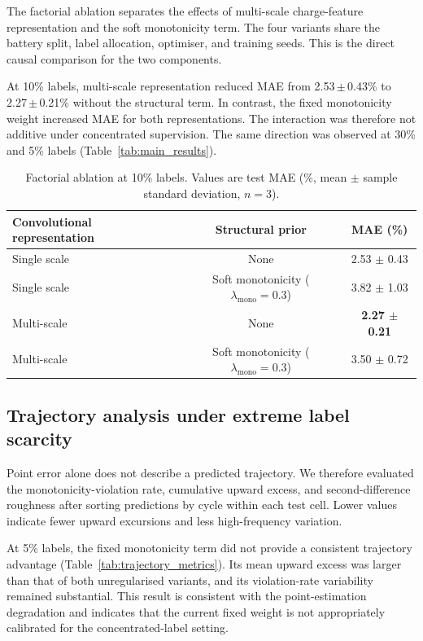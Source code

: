 \documentclass[pdflatex,sn-mathphys-num]{sn-jnl}
\begin{document}
The factorial ablation separates the effects of multi-scale charge-feature representation and the soft monotonicity term. The four variants share the battery split, label allocation, optimiser, and training seeds. This is the direct causal comparison for the two components.

At 10\% labels, multi-scale representation reduced MAE from 2.53\,$\pm$\,0.43\% to 2.27\,$\pm$\,0.21\% without the structural term. In contrast, the fixed monotonicity weight increased MAE for both representations. The interaction was therefore not additive under concentrated supervision. The same direction was observed at 30\% and 5\% labels (Table~\ref{tab:main_results}).

\begin{table}[t]
\caption{Factorial ablation at 10\% labels. Values are test MAE (\%, mean $\pm$ sample standard deviation, $n=3$).}
\label{tab:ablation}
\centering
\small
\begin{tabular*}{\textwidth}{@{\extracolsep{\fill}}lcc@{}}
\toprule
Convolutional representation & Structural prior & MAE (\%) \\
\midrule
Single scale & None & 2.53 $\pm$ 0.43 \\
Single scale & Soft monotonicity ($\lambda_{\mathrm{mono}}=0.3$) & 3.82 $\pm$ 1.03 \\
Multi-scale & None & \textbf{2.27 $\pm$ 0.21} \\
Multi-scale & Soft monotonicity ($\lambda_{\mathrm{mono}}=0.3$) & 3.50 $\pm$ 0.72 \\
\bottomrule
\end{tabular*}
\end{table}

\subsection{Trajectory analysis under extreme label scarcity}
\label{subsec:trajectory_analysis}

Point error alone does not describe a predicted trajectory. We therefore evaluated the monotonicity-violation rate, cumulative upward excess, and second-difference roughness after sorting predictions by cycle within each test cell. Lower values indicate fewer upward excursions and less high-frequency variation.

At 5\% labels, the fixed monotonicity term did not provide a consistent trajectory advantage (Table~\ref{tab:trajectory_metrics}). Its mean upward excess was larger than that of both unregularised variants, and its violation-rate variability remained substantial. This result is consistent with the point-estimation degradation and indicates that the current fixed weight is not appropriately calibrated for the concentrated-label setting.
\end{document}
